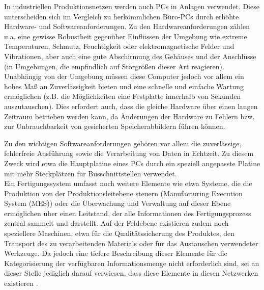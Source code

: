 In industriellen Produktionsnetzen werden auch PCs in Anlagen verwendet. Diese unterscheiden sich im Vergleich zu herkömmlichen Büro-PCs durch erhöhte Hardware- und Softwareanforderungen. Zu den Hardwareanforderungen zählen u.a. eine gewisse Robustheit gegenüber Einflüssen der Umgebung wie extreme Temperaturen, Schmutz, Feuchtigkeit oder elektromagnetische Felder und Vibrationen, aber auch eine gute Abschirmung des Gehäuses und der Anschlüsse (in Umgebungen, die empfindlich auf Störgrößen dieser Art reagieren). 
Unabhängig von der Umgebung müssen diese Computer jedoch vor allem ein hohes Maß an Zuverlässigkeit bieten und eine schnelle und einfache Wartung ermöglichen (z.B. die Möglichkeiten eine Festplatte innerhalb von Sekunden auszutauschen). Dies erfordert auch, dass die gleiche Hardware über einen langen Zeitraum betrieben werden kann, da Änderungen der Hardware zu Fehlern bzw. zur Unbrauchbarkeit von gesicherten Speicherabbildern führen können. 

Zu den wichtigen Softwareanforderungen gehören vor allem die zuverlässige, fehlerfreie Ausführung sowie die Verarbeitung von Daten in Echtzeit. Zu diesem Zweck wird etwa die Hauptplatine eines PCs durch ein speziell angepasste Platine mit mehr Steckplätzen für Busschnittstellen verwendet.\\

Ein Fertigungssystem umfasst noch weitere Elemente wie etwa Systeme, die die Produktion von der Produktionsleitebene steuern (Manufacturing Execution System (MES)) oder die Überwachung und Verwaltung auf dieser Ebene ermöglichen über einen Leitstand, der alle Informationen des Fertigungsprozess zentral sammelt und darstellt. Auf der Feldebene existieren zudem noch speziellere Maschinen, etwa für die Qualitätssicherung des Produktes, den Transport des zu verarbeitenden Materials oder für das Austauschen verwendeter Werkzeuge. Da jedoch eine tiefere Beschreibung dieser Elemente für die Kategorisierung der verfügbaren Informationsmenge nicht erforderlich sind, sei an dieser Stelle jediglich darauf verwiesen, dass diese Elemente in diesen Netzwerken existieren \citep{Hoenle2017}.

